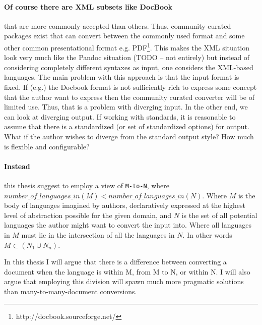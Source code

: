 \documentclass{scrreprt}
\begin{document}
\paragraph{Of course there are XML subsets like DocBook} that are more commonly accepted than others. Thus, community curated packages exist that can convert between the commonly used format and some other common presentational format e.g. PDF\footnote{http://docbook.sourceforge.net/}. This makes the XML situation look very much like the Pandoc situation (TODO -- not entirely) but instead of considering completely different syntaxes as input, one considers the XML-based languages. The main problem with this approach is that the input format is fixed. If (e.g.) the Docbook format is not sufficiently rich to express some concept that the author want to express then the community curated converter will be of limited use. Thus, that is a problem with diverging input. In the other end, we can look at diverging output. If working with standards, it is reasonable to assume that there is a standardized (or set of standardized options) for output. What if the author wishes to diverge from the standard output style? How much is flexible and configurable?

\paragraph{Instead} this thesis suggest to employ a view of \texttt{M-to-N}, where \(number\_of\_languages\_in(M) < number\_of\_languages\_in(N)\). Where \(M\) is the body of  languages imagined by authors, declaratively expressed at the highest level of abstraction possible for the given domain, and \(N\) is the set of all potential languages the author might want to convert the input into. Where all languages in \(M\) must lie in the intersection of all the languages in \(N\). In other words \texttt{\(M \subset (N_1 \cup N_n) \)}. 

In this thesis I will argue that there is a difference between converting a document when the language is within M, from M to N, or within N. I will also argue that employing this division will spawn much more pragmatic solutions than many-to-many-document conversions.
\end{document}
